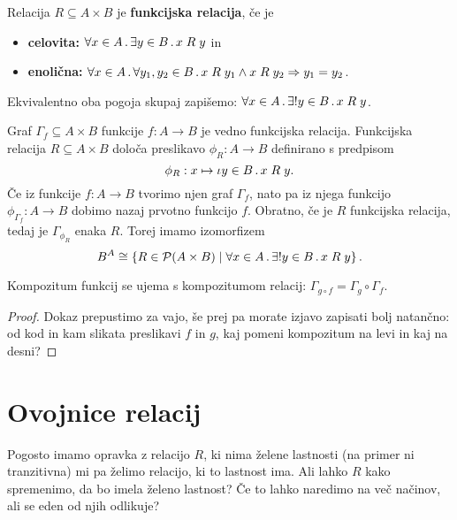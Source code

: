 \begin{definicija}
  Relacija $R \subseteq A \times B$ je \textbf{funkcijska relacija}, če je
  \begin{itemize}
  \item \textbf{celovita:} $\forall x \in A \,.\, \exists y \in B \,.\, x \mathrel{R} y$ in
  \item \textbf{enolična:} $\forall x \in A \,.\, \forall y_1, y_2 \in B \,.\, x \mathrel{R} y_1 \land x \mathrel{R} y_2 \Rightarrow y_1 = y_2$.
  \end{itemize}
  Ekvivalentno oba pogoja skupaj zapišemo: $\forall x \in A \,.\, \exists! y \in B \,.\, x \mathrel{R} y$.
\end{definicija}

Graf $\Gamma_{\!f} \subseteq A \times B$ funkcije $f : A \to B$ je vedno funkcijska relacija.
%
Funkcijska relacija $R \subseteq A \times B$ določa preslikavo $\phi_R : A \to B$ definirano s predpisom
%
\begin{equation*}
  \phi_R : x \mapsto \iota y \in B \,.\, x \mathrel{R} y.
\end{equation*}
%
Če iz funkcije $f : A \to B$ tvorimo njen graf $\Gamma_{\!f}$, nato pa iz njega funkcijo
$\phi_{\Gamma_{\!f}} : A \to B$ dobimo nazaj prvotno funkcijo $f$. Obratno, če je $R$ funkcijska relacija, tedaj je $\Gamma_{\phi_R}$ enaka $R$. Torej imamo izomorfizem
%
\begin{equation*}
  B^A \cong \left\{ R \in \mathcal{P}(A \times B) \; \middle| \; \forall x \in A \,.\, \exists! y \in B \,.\, x \mathrel{R} y \right\}.
\end{equation*}
%

\begin{izjava}
  Kompozitum funkcij se ujema s kompozitumom relacij:
  $\Gamma_{g \circ f} = \Gamma_g \circ \Gamma_{\!f}$.
\end{izjava}

\begin{proof}
  Dokaz prepustimo za vajo, še prej pa morate izjavo zapisati bolj natančno: od
  kod in kam slikata preslikavi $f$ in $g$, kaj pomeni kompozitum na levi in kaj
  na desni?
\end{proof}


\section{Ovojnice relacij}

Pogosto imamo opravka z relacijo $R$, ki nima želene lastnosti (na primer ni
tranzitivna) mi pa želimo relacijo, ki to lastnost ima. Ali lahko $R$ kako
spremenimo, da bo imela želeno lastnost? Če to lahko naredimo na več načinov,
ali se eden od njih odlikuje?

